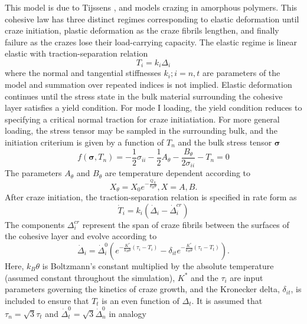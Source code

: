 This model is due to Tijssens \etal \cite{Tijssens2001},  
and models
crazing in amorphous polymers. This cohesive law has three distinct regimes
corresponding to elastic deformation until craze initiation, plastic
deformation as the craze fibrils lengthen, and finally
failure as the crazes lose their load-carrying capacity. The elastic
regime is linear elastic with traction-separation relation 
\begin{equation}
T_i = k_i \Delta_i 
\end{equation}
where the normal and tangential stiffnesses $k_i; i = n, t$ are 
parameters of the model and summation over repeated indices is not
implied. Elastic deformation continues
until the stress state in the bulk material surrounding the cohesive
layer satisfies a yield condition. For mode I loading,
the yield condition reduces to specifying a critical normal traction for
craze initiatiation. For more general loading, the stress
tensor may be sampled in the surrounding bulk, and the initiation criterium
is given by a function of $T_n$ and the bulk stress tensor $\mathbf{\sigma}$
\begin{equation}
f(\mathbf{\sigma},T_n) = -\frac{1}{2} \sigma_{ii} - \frac{1}{2} A_\theta - \frac{B_\theta}{2 \sigma_{ii}} - T_n = 0
\end{equation}
The parameters $A_\theta$ and  $B_\theta$ are temperature dependent 
according to
\begin{equation}
X_\theta = X_0 e^{-\frac{Q_X}{k_B \theta}}, X = A, B.
\end{equation}
After craze initiation, the traction-separation relation is specified
in rate form as 
\begin{equation}
\dot{T}_i = 
k_i (\dot{\Delta}_i - \dot{\Delta}_i^{cr}) 
\end{equation}
The components $\Delta_i^{cr}$ represent the span of craze fibrils between
the surfaces of the cohesive layer and evolve according to 
\begin{equation}
\dot{\Delta}_i = \dot{\Delta}_i^0 (e^{-\frac{K^*}{k_B \theta} 
(\tau_i-T_i)}-\delta_{it} e^{-\frac{K^*}{k_B \theta} (\tau_t-T_t)}).
\end{equation}
Here, $k_B \theta$ is Boltzmann's constant multiplied by the absolute
temperature (assumed constant throughout the simulation), $K^*$ and the
$\tau_i$ are input parameters governing the kinetics of craze growth,
and the Kronecker delta, $\delta_{it}$, is included to ensure that $T_t$
is an even function of $\Delta_t$. It is assumed that $\tau_n = \sqrt{3} 
\tau_t$ and $\dot{\Delta}_t^0 = \sqrt{3} \dot{\Delta}_n^0$ in analogy 
